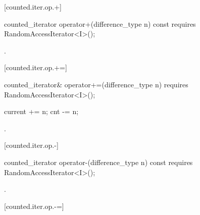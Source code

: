 \begin{addedblock}
[counted.iter.op.+]{}

%
%
\begin{itemdecl}
  counted_iterator operator+(difference_type n) const
    requires RandomAccessIterator<I>();
\end{itemdecl}

\begin{itemdescr}
\pnum
\requires {}

\pnum
{}
.
\end{itemdescr}

[counted.iter.op.+=]{}

%
%
\begin{itemdecl}
  counted_iterator& operator+=(difference_type n)
    requires RandomAccessIterator<I>();
\end{itemdecl}

\begin{itemdescr}
\pnum
\requires {}

\pnum
\effects
\begin{codeblock}
current += n;
cnt -= n;
\end{codeblock}

\pnum
\returns {}.
\end{itemdescr}

[counted.iter.op.-]{}

%
%
\begin{itemdecl}
  counted_iterator operator-(difference_type n) const
    requires RandomAccessIterator<I>();
\end{itemdecl}

\begin{itemdescr}
\pnum
\requires {}

\pnum
{}
.
\end{itemdescr}

[counted.iter.op.-=]{}


\end{addedblock}
